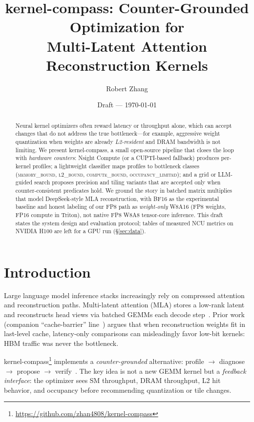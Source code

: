 \documentclass[11pt]{article}
\title{\textsf{kernel-compass}: Counter-Grounded Optimization for\\
Multi-Latent Attention Reconstruction Kernels}
\author{Robert Zhang}
\date{Draft --- \today}
\begin{document}
\maketitle

\begin{abstract}
Neural kernel optimizers often reward latency or throughput alone, which can accept changes that do not address the true bottleneck---for example, aggressive weight quantization when weights are already \emph{L2-resident} and DRAM bandwidth is not limiting.
We present \textsf{kernel-compass}, a small open-source pipeline that closes the loop with \emph{hardware counters}: Nsight Compute (or a CUPTI-based fallback) produces per-kernel profiles; a lightweight classifier maps profiles to bottleneck classes (\textsc{memory\_bound}, \textsc{l2\_bound}, \textsc{compute\_bound}, \textsc{occupancy\_limited}); and a grid or LLM-guided search proposes precision and tiling variants that are accepted only when counter-consistent predicates hold.
We ground the story in batched matrix multiplies that model DeepSeek-style MLA reconstruction, with BF16 as the experimental baseline and honest labeling of our FP8 path as \emph{weight-only} W8A16 (FP8 weights, FP16 compute in Triton), not native FP8 W8A8 tensor-core inference.
This draft states the system design and evaluation protocol; tables of measured NCU metrics on NVIDIA H100 are left for a GPU run (\S\ref{sec:data}).
\end{abstract}

\section{Introduction}
Large language model inference stacks increasingly rely on compressed attention and reconstruction paths.
Multi-latent attention (MLA) stores a low-rank latent and reconstructs head views via batched GEMMs each decode step~\citep{deepseekv3}.
Prior work (companion ``cache-barrier'' line~\citep{cachebarrier2026}) argues that when reconstruction weights fit in last-level cache, latency-only comparisons can misleadingly favor low-bit kernels: HBM traffic was never the bottleneck.

\textsf{kernel-compass}\footnote{\url{https://github.com/zhan4808/kernel-compass}} implements a \emph{counter-grounded} alternative: profile $\rightarrow$ diagnose $\rightarrow$ propose $\rightarrow$ verify~\citep{kernelcompass2026}.
The key idea is not a new GEMM kernel but a \emph{feedback interface}: the optimizer sees SM throughput, DRAM throughput, L2 hit behavior, and occupancy before recommending quantization or tile changes.
\end{document}
